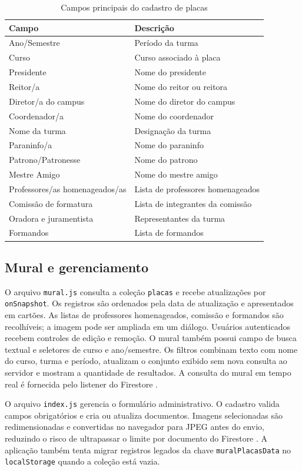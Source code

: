 \documentclass[12pt]{article}
\begin{document}
\begin{table}[ht]
\centering
\caption{Campos principais do cadastro de placas}
\label{tab:fields}
\begin{tabular}{p{4cm}p{10cm}}
\hline
Campo & Descrição \\
\hline
Ano/Semestre & Período da turma \\
Curso & Curso associado à placa \\
Presidente & Nome do presidente \\
Reitor/a & Nome do reitor ou reitora \\
Diretor/a do campus & Nome do diretor do campus \\
Coordenador/a & Nome do coordenador \\
Nome da turma & Designação da turma \\
Paraninfo/a & Nome do paraninfo \\
Patrono/Patronesse & Nome do patrono \\
Mestre Amigo & Nome do mestre amigo \\
Professores/as homenageados/as & Lista de professores homenageados \\
Comissão de formatura & Lista de integrantes da comissão \\
Oradora e juramentista & Representantes da turma \\
Formandos & Lista de formandos \\
\hline
\end{tabular}
\end{table}

\subsection{Mural e gerenciamento}

O arquivo \texttt{mural.js} consulta a coleção \texttt{placas} e recebe
atualizações por \texttt{onSnapshot}. Os registros são ordenados pela data de
atualização e apresentados em cartões. As listas de professores homenageados,
comissão e formandos são recolhíveis; a imagem pode ser ampliada em um diálogo.
Usuários autenticados recebem controles de edição e remoção. O mural também
possui campo de busca textual e seletores de curso e ano/semestre. Os filtros
combinam texto com nome do curso, turma e período, atualizam o conjunto exibido
sem nova consulta ao servidor e mostram a quantidade de resultados. A consulta
do mural em tempo real é fornecida pelo listener do Firestore
\cite{firestorelisten}.

O arquivo \texttt{index.js} gerencia o formulário administrativo. O cadastro
valida campos obrigatórios e cria ou atualiza documentos. Imagens selecionadas
são redimensionadas e convertidas no navegador para JPEG antes do envio,
reduzindo o risco de ultrapassar o limite por documento do Firestore
\cite{firestorequotas}. A aplicação também tenta migrar registros legados da
chave \texttt{muralPlacasData} no \texttt{localStorage} quando a coleção está
vazia.
\end{document}
